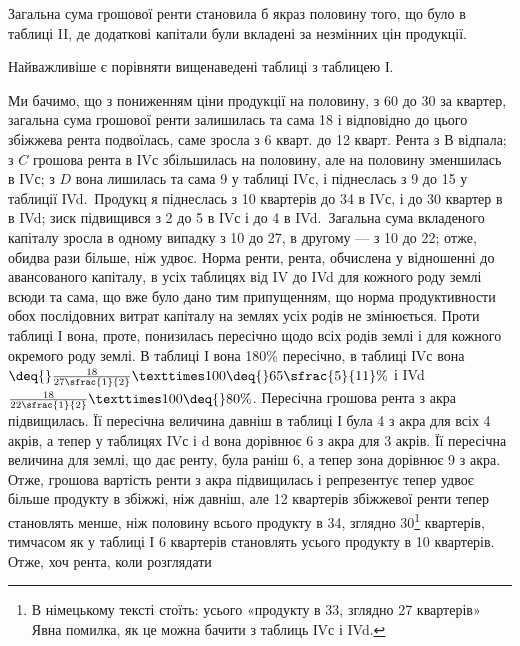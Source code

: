 

Загальна сума грошової ренти становила б якраз половину того, що було
в таблиці II, де додаткові капітали були вкладені за незмінних цін продукції.

Найважливіше є порівняти вищенаведені таблиці з таблицею І.

Ми бачимо, що з пониженням ціни продукції на половину, з 60 до
30 за квартер, загальна сума грошової ренти залишилась та сама \deq{} 18 і відповідно до цього збіжжева рента подвоїлась, саме зросла з 6 кварт. до
12 кварт. Рента з $В$ відпала; з $C$ грошова рента в ІVс збільшилась на половину,
але на половину зменшилась в ІVс; з $D$ вона лишилась та сама \deq{} 9 у таблиці ІVс, і піднеслась з 9 до 15 у таблиції ІVd.~Продукц я піднеслась з 10 квартерів до 34 в ІVс, і до 30 квартер в в IVd;
зиск підвищився з 2 до 5 в ІVс і до 4 в IVd.~Загальна сума
вкладеного капіталу зросла в одному випадку з 10 до 27,
в другому — з 10 до 22; отже, обидва рази більше, ніж удвоє. Норма
ренти, рента, обчислена у відношенні до авансованого капіталу, в усіх таблицях
від IV до IVd для кожного роду землі всюди та сама, що вже було дано тим припущенням,
що норма продуктивности обох послідовних витрат капіталу на землях
усіх родів не змінюється. Проти таблиці І вона, проте, понизилась пересічно
щодо всіх родів землі і для кожного окремого роду землі. В таблиці І вона \deq{}
180\% пересічно, в таблиці ІVс вона$ \deq{} \frac{18}{27\sfrac{1}{2}} × 100 \deq{} 65\sfrac{5}{11}\%$ і
IVd \deq{} $\frac{18}{22\sfrac{1}{2}} × 100 \deq{} 80\%$. Пересічна грошова рента з акра підвищилась. Її пересічна
величина давніш в таблиці І була 4 з акра для всіх 4 акрів,
а тепер у таблицях IVс і d вона дорівнює 6 з акра для 3 акрів.
Її пересічна величина для землі, що дає ренту, була раніш 6, а тепер
зона дорівнює 9 з акра. Отже, грошова вартість ренти з акра підвищилась
і репрезентує тепер удвоє більше продукту в збіжжі, ніж давніш, але
12 квартерів збіжжевої ренти тепер становлять менше, ніж половину всього продукту
в 34, зглядно 30\footnote*{В німецькому тексті стоїть: усього «продукту в 33, зглядно 27 квартерів» Явна помилка,
як це можна бачити з таблиць ІVс і IVd. } квартерів, тимчасом як у таблиці І 6 квартерів становлять
  усього продукту в 10 квартерів. Отже, хоч рента, коли розглядати
